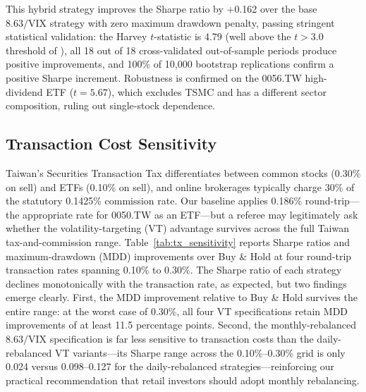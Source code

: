 This hybrid strategy improves the Sharpe ratio by +0.162 over the base $8.63/\text{VIX}$ strategy with zero maximum drawdown penalty, passing stringent statistical validation: the Harvey $t$-statistic is 4.79 (well above the $t > 3.0$ threshold of \citealt{harvey2016}), all 18 out of 18 cross-validated out-of-sample periods produce positive improvements, and 100\% of 10,000 bootstrap replications confirm a positive Sharpe increment. Robustness is confirmed on the 0056.TW high-dividend ETF ($t = 5.67$), which excludes TSMC and has a different sector composition, ruling out single-stock dependence.%


\subsection{Transaction Cost Sensitivity}\label{sec:tx_sensitivity}

Taiwan's Securities Transaction Tax differentiates between common stocks (0.30\% on
sell) and ETFs (0.10\% on sell), and online brokerages typically charge 30\% of the
statutory 0.1425\% commission rate. Our baseline applies 0.186\% round-trip---the
appropriate rate for 0050.TW as an ETF---but a referee may legitimately ask whether
the volatility-targeting (VT) advantage survives across the full Taiwan tax-and-commission
range. Table~\ref{tab:tx_sensitivity} reports Sharpe ratios and maximum-drawdown (MDD)
improvements over Buy \& Hold at four round-trip transaction rates spanning 0.10\% to
0.30\%. The Sharpe ratio of each strategy declines monotonically with the transaction
rate, as expected, but two findings emerge clearly. First, the MDD improvement
relative to Buy \& Hold survives the entire range: at the worst case of 0.30\%, all
four VT specifications retain MDD improvements of at least 11.5 percentage points.
Second, the monthly-rebalanced $8.63/\text{VIX}$ specification is far less sensitive to
transaction costs than the daily-rebalanced VT variants---its Sharpe range across the
0.10\%--0.30\% grid is only 0.024 versus 0.098--0.127 for the daily-rebalanced
strategies---reinforcing our practical recommendation that retail investors should
adopt monthly rebalancing.

